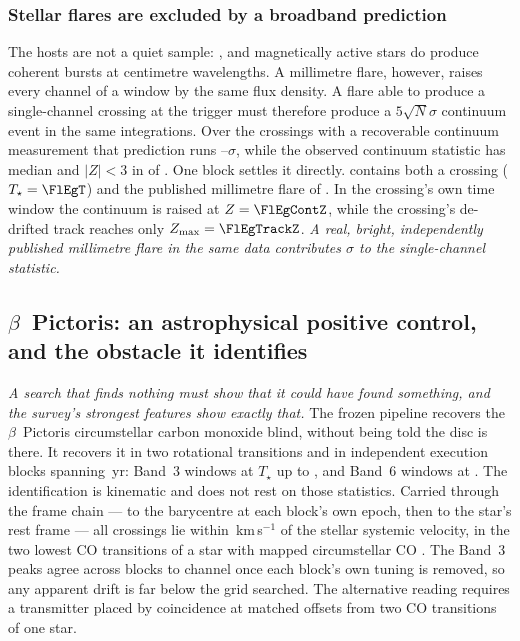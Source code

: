 \subsubsection{Stellar flares are excluded by a broadband prediction}

The hosts are not a quiet sample: \HostActiveClause, and magnetically
active stars do produce coherent
bursts at centimetre wavelengths. A millimetre flare, however, raises every
channel of a window by the same flux density. A flare able to produce a
single-channel crossing at the trigger must therefore produce a
$5\sqrt{N}\sigma$
continuum event in the same integrations. Over the \FlNCont{} crossings with
a recoverable continuum measurement that prediction runs
\FlPredLo--\FlPredHi$\sigma$, while the observed continuum statistic has
median \FlObsMed{} and $|Z|<3$ in \FlNQuiet{} of \FlNCont. One block settles
it directly. \FlEgStar{} \texttt{\FlEgEb} contains both a crossing
($T_\star=\FlEgT$) and the published millimetre flare of
\citet{MacGregor2020}. In the crossing's own time window the continuum is
raised at $Z=\FlEgContZ$, while the crossing's de-drifted track reaches only
$Z_{\max}=\FlEgTrackZ$. \emph{A real, bright, independently published
millimetre flare in the same data contributes \FlEgContrib$\sigma$ to the
single-channel statistic.}

\subsection{$\beta$~Pictoris: an astrophysical positive control, and the
obstacle it identifies} \label{sec:bpicval}

\emph{A search that finds nothing must show that it could have found
something, and the survey's strongest features show exactly that.} The
frozen pipeline recovers the $\beta$~Pictoris circumstellar carbon monoxide
blind, without being told the disc is there. It recovers it in two
rotational transitions and in \NStageOneBpicEb{} independent execution
blocks spanning \BpBaselineYr\,yr: \BpicNFlagThree{} Band~3 windows at
$T_\star$ up to \BpicBThreeTsym, and \BpicNFlagSix{} Band~6 windows at
\BpicBSixTsym. The identification is kinematic and does not rest on those
statistics. Carried through the frame chain --- to the barycentre at each
block's own epoch, then to the star's rest frame --- all \BpicPanelNCo{}
crossings lie within \BpicDvCoHi\,km\,s$^{-1}$ of the stellar systemic
velocity, in the two lowest CO transitions of a star with mapped
circumstellar CO \citep{Dent2014,Matra2017}. The Band~3 peaks agree across blocks to
\BpRecThreeTuneChanMax{} channel once each block's own tuning is removed, so
any apparent drift is far below the grid searched. The alternative reading
requires a transmitter placed by coincidence at matched offsets from two CO
transitions of one star.

